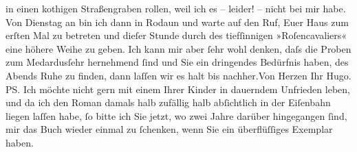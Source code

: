 \begin{ledgroupsized}[t]{13cm}
               in einen kothigen Straßengraben rollen, weil ich es – leider! – nicht bei mir
               habe.\pend
           \pstart
           Von Dienstag an bin ich dann in Rodaun
               und warte auf den Ruf, Euer Haus zum erſten Mal zu betreten und dieſer Stunde durch
                  \label{K_L01973_1v}\label{K_L01973_1h} des
               tiefſinnigen »Roſencavaliers« {\pb}eine höhere Weihe zu geben.\pend
           \pstart
           Ich kann mir aber ſehr wohl denken, daſs die Proben zum Medardusſehr hernehmend ſind und Sie ein dringendes
               Bedürfnis haben, des Abends Ruhe zu finden, dann laſſen wir es halt bis
                  nachher.\hspace*{1.5em}Von Herzen Ihr\pend
           \pstart \spacefill\mbox{Hugo.}\pend{}\pstart
           \noindent{}{\pb}\textsc{PS}. Ich möchte nicht gern mit einem Ihrer Kinder in
                  dauerndem Unfrieden leben, und da ich den Roman damals halb zufällig halb abſichtlich in der
                  Eiſenbahn liegen laſſen habe, ſo bitte ich Sie jetzt, wo zwei Jahre darüber
                  hingegangen ſind, mir das Buch wieder einmal zu ſchenken, wenn Sie ein
                  überflüſſiges Exemplar haben.\pend
           \endnumbering{}\end{ledgroupsized}  \newcommand{\dateiname}{L01973}\newcommand{\titel}{Hugo von Hofmannsthal an Arthur Schnitzler, [29. 10. 1910]}\newcommand{\editorInnen}{Martin Anton Müller und Gerd-Hermann Susen}
            \footnotesize
\begin{ledgroupsized}[t]{11.5cm}
\end{ledgroupsized}
         
      